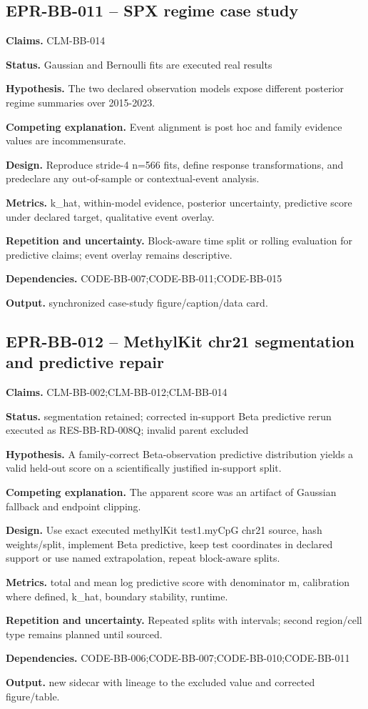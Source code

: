\subsection{EPR-BB-011 -- SPX regime case study}
\textbf{Claims.} CLM-BB-014\par
\textbf{Status.} Gaussian and Bernoulli fits are executed real results\par
\textbf{Hypothesis.} The two declared observation models expose different posterior regime summaries over 2015-2023.\par
\textbf{Competing explanation.} Event alignment is post hoc and family evidence values are incommensurate.\par
\textbf{Design.} Reproduce stride-4 n=566 fits, define response transformations, and predeclare any out-of-sample or contextual-event analysis.\par
\textbf{Metrics.} k\_hat, within-model evidence, posterior uncertainty, predictive score under declared target, qualitative event overlay.\par
\textbf{Repetition and uncertainty.} Block-aware time split or rolling evaluation for predictive claims; event overlay remains descriptive.\par
\textbf{Dependencies.} CODE-BB-007;CODE-BB-011;CODE-BB-015\par
\textbf{Output.} synchronized case-study figure/caption/data card.

\subsection{EPR-BB-012 -- MethylKit chr21 segmentation and predictive repair}
\textbf{Claims.} CLM-BB-002;CLM-BB-012;CLM-BB-014\par
\textbf{Status.} segmentation retained; corrected in-support Beta predictive rerun executed as RES-BB-RD-008Q; invalid parent excluded\par
\textbf{Hypothesis.} A family-correct Beta-observation predictive distribution yields a valid held-out score on a scientifically justified in-support split.\par
\textbf{Competing explanation.} The apparent score was an artifact of Gaussian fallback and endpoint clipping.\par
\textbf{Design.} Use exact executed methylKit test1.myCpG chr21 source, hash weights/split, implement Beta predictive, keep test coordinates in declared support or use named extrapolation, repeat block-aware splits.\par
\textbf{Metrics.} total and mean log predictive score with denominator m, calibration where defined, k\_hat, boundary stability, runtime.\par
\textbf{Repetition and uncertainty.} Repeated splits with intervals; second region/cell type remains planned until sourced.\par
\textbf{Dependencies.} CODE-BB-006;CODE-BB-007;CODE-BB-010;CODE-BB-011\par
\textbf{Output.} new sidecar with lineage to the excluded value and corrected figure/table.

